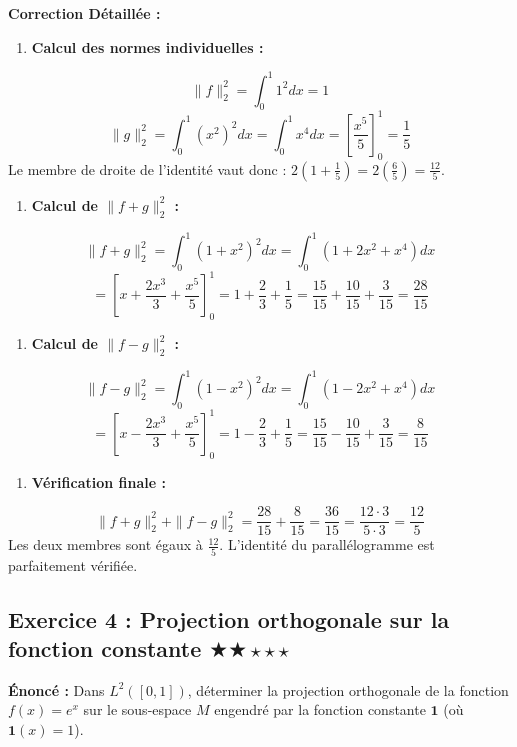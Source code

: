 \documentclass[11pt,a4paper]{article}
\begin{document}
\textbf{Correction Détaillée :}
\begin{enumerate}
\item \textbf{Calcul des normes individuelles :}
\end{enumerate}
   $$ \|f\|_2^2 = \int_0^1 1^2 dx = 1 $$
   $$ \|g\|_2^2 = \int_0^1 (x^2)^2 dx = \int_0^1 x^4 dx = \left[ \frac{x^5}{5} \right]_0^1 = \frac{1}{5} $$
   Le membre de droite de l'identité vaut donc : $2(1 + \frac{1}{5}) = 2(\frac{6}{5}) = \frac{12}{5}$.
\begin{enumerate}
\item \textbf{Calcul de $\|f+g\|_2^2$ :}
\end{enumerate}
   $$ \|f+g\|_2^2 = \int_0^1 (1+x^2)^2 dx = \int_0^1 (1 + 2x^2 + x^4) dx $$
   $$ = \left[ x + \frac{2x^3}{3} + \frac{x^5}{5} \right]_0^1 = 1 + \frac{2}{3} + \frac{1}{5} = \frac{15}{15} + \frac{10}{15} + \frac{3}{15} = \frac{28}{15} $$
\begin{enumerate}
\item \textbf{Calcul de $\|f-g\|_2^2$ :}
\end{enumerate}
   $$ \|f-g\|_2^2 = \int_0^1 (1-x^2)^2 dx = \int_0^1 (1 - 2x^2 + x^4) dx $$
   $$ = \left[ x - \frac{2x^3}{3} + \frac{x^5}{5} \right]_0^1 = 1 - \frac{2}{3} + \frac{1}{5} = \frac{15}{15} - \frac{10}{15} + \frac{3}{15} = \frac{8}{15} $$
\begin{enumerate}
\item \textbf{Vérification finale :}
\end{enumerate}
   $$ \|f+g\|_2^2 + \|f-g\|_2^2 = \frac{28}{15} + \frac{8}{15} = \frac{36}{15} = \frac{12 \cdot 3}{5 \cdot 3} = \frac{12}{5} $$
   Les deux membres sont égaux à $\frac{12}{5}$. L'identité du parallélogramme est parfaitement vérifiée.



\subsection*{Exercice 4 : Projection orthogonale sur la fonction constante \quad $\bigstar\bigstar\star\star\star$}

\textbf{Énoncé :}
Dans $L^2([0,1])$, déterminer la projection orthogonale de la fonction $f(x) = e^x$ sur le sous-espace $M$ engendré par la fonction constante $\mathbf{1}$ (où $\mathbf{1}(x) = 1$).
\end{document}
